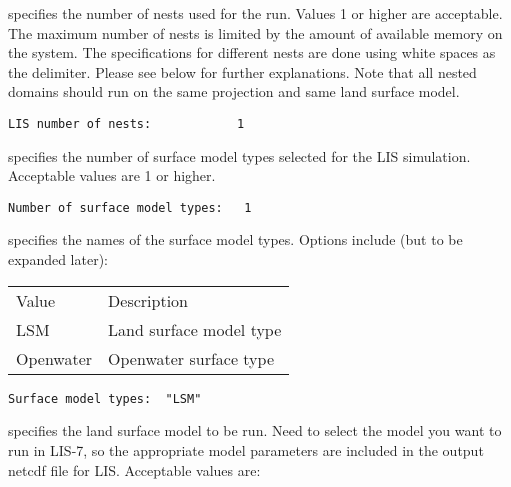  
  specifies the number of nests used
 for the run.
 Values 1 or higher are acceptable. The maximum number of nests is
 limited by the amount of available memory on the system.
 The specifications for different nests are done using white spaces
 as the delimiter. Please see below for further explanations. Note
 that all nested domains should run on the same projection and same
 land surface model.
 

 \begin{Verbatim}[frame=single]
LIS number of nests:            1
 \end{Verbatim}

 
  specifies the number of 
 surface model types selected for the LIS simulation.
 Acceptable values are 1 or higher.
 

 \begin{Verbatim}[frame=single]
Number of surface model types:   1 
 \end{Verbatim}

 
  specifies the names of the surface
 model types. Options include (but to be expanded later):

 \begin{tabular}{ll}
 Value   & Description                \\
 LSM     &  Land surface model type   \\
 Openwater &  Openwater surface type  \\
 \end{tabular}
 

 \begin{Verbatim}[frame=single]
Surface model types:  "LSM"
 \end{Verbatim}

 
  specifies the land surface model to be run.
  Need to select the model you want to run in LIS-7, so the appropriate
  model parameters are included in the output netcdf file for LIS.
 Acceptable values are:

